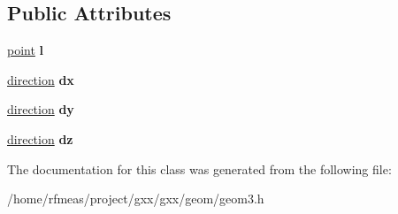 \subsection*{Public Attributes}
\begin{DoxyCompactItemize}
\item 
\hyperlink{classgxx_1_1geom3_1_1point}{point} {\bfseries l}\hypertarget{classgxx_1_1geom3_1_1axis3_acaf815f5b992130f930e6e153b5c5839}{}\label{classgxx_1_1geom3_1_1axis3_acaf815f5b992130f930e6e153b5c5839}

\item 
\hyperlink{classgxx_1_1geom3_1_1direction}{direction} {\bfseries dx}\hypertarget{classgxx_1_1geom3_1_1axis3_a93d1340ebbf0c155bc6b8eb0ecfdaab4}{}\label{classgxx_1_1geom3_1_1axis3_a93d1340ebbf0c155bc6b8eb0ecfdaab4}

\item 
\hyperlink{classgxx_1_1geom3_1_1direction}{direction} {\bfseries dy}\hypertarget{classgxx_1_1geom3_1_1axis3_abd942ab6e426e41dcae1edb8ce790d3f}{}\label{classgxx_1_1geom3_1_1axis3_abd942ab6e426e41dcae1edb8ce790d3f}

\item 
\hyperlink{classgxx_1_1geom3_1_1direction}{direction} {\bfseries dz}\hypertarget{classgxx_1_1geom3_1_1axis3_adc94694684edd334578748efb4b44068}{}\label{classgxx_1_1geom3_1_1axis3_adc94694684edd334578748efb4b44068}

\end{DoxyCompactItemize}


The documentation for this class was generated from the following file\+:\begin{DoxyCompactItemize}
\item 
/home/rfmeas/project/gxx/gxx/geom/geom3.\+h\end{DoxyCompactItemize}
